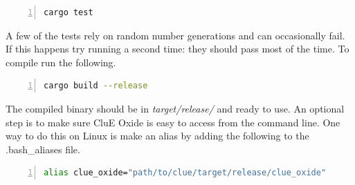 \documentclass{book}
\begin{document}
\begin{lstlisting}[frame=single,numbers=left,language=bash]
cargo test
\end{lstlisting}
A few of the tests rely on random number generations and can occasionally fail.
If this happens try running a second time: they should pass most of the time.
To compile run the following.
\begin{lstlisting}[frame=single,numbers=left,language=bash]
cargo build --release
\end{lstlisting}
The compiled binary should be in \textit{target/release/} and ready to use.
An optional step is to make sure CluE Oxide is easy to access from 
the command line.
One way to do this on Linux is make an alias by adding the following to 
the .bash\_aliases file.
\begin{lstlisting}[frame=single,numbers=left,language=bash]
alias clue_oxide="path/to/clue/target/release/clue_oxide"
\end{lstlisting}

\end{document}
